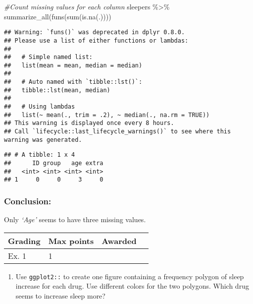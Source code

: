 \documentclass[
]{article}
\newenvironment{Shaded}{\begin{snugshade}}{\end{snugshade}}
\newcommand{\CommentTok}[1]{\textcolor[rgb]{0.56,0.35,0.01}{\textit{#1}}}
\newcommand{\FunctionTok}[1]{\textcolor[rgb]{0.00,0.00,0.00}{#1}}
\newcommand{\NormalTok}[1]{#1}
\newcommand{\SpecialCharTok}[1]{\textcolor[rgb]{0.00,0.00,0.00}{#1}}
\providecommand{\tightlist}{%
  \setlength{\itemsep}{0pt}\setlength{\parskip}{0pt}}
\begin{document}
\begin{Shaded}
\begin{Highlighting}[]
\CommentTok{\#Count missing values for each column}
\NormalTok{sleepers }\SpecialCharTok{\%\textgreater{}\%} 
  \FunctionTok{summarize\_all}\NormalTok{(}\FunctionTok{funs}\NormalTok{(}\FunctionTok{sum}\NormalTok{(}\FunctionTok{is.na}\NormalTok{(.))))}
\end{Highlighting}
\end{Shaded}

\begin{verbatim}
## Warning: `funs()` was deprecated in dplyr 0.8.0.
## Please use a list of either functions or lambdas: 
## 
##   # Simple named list: 
##   list(mean = mean, median = median)
## 
##   # Auto named with `tibble::lst()`: 
##   tibble::lst(mean, median)
## 
##   # Using lambdas
##   list(~ mean(., trim = .2), ~ median(., na.rm = TRUE))
## This warning is displayed once every 8 hours.
## Call `lifecycle::last_lifecycle_warnings()` to see where this warning was generated.
\end{verbatim}

\begin{verbatim}
## # A tibble: 1 x 4
##      ID group   age extra
##   <int> <int> <int> <int>
## 1     0     0     3     0
\end{verbatim}

\hypertarget{conclusion}{%
\subsubsection{Conclusion:}\label{conclusion}}

Only \emph{`Age'} seems to have three missing values.

\begin{longtable}[]{@{}llll@{}}
\toprule()
Grading & Max points & Awarded & \\
\midrule()
\endhead
Ex. 1 & 1 & & \\
\bottomrule()
\end{longtable}

\begin{enumerate}
\def\labelenumi{\arabic{enumi}.}
\setcounter{enumi}{1}
\tightlist
\item
  Use \texttt{ggplot2::} to create one figure containing a frequency
  polygon of sleep increase for each drug. Use different colors for the
  two polygons. Which drug seems to increase sleep more?
\end{enumerate}
\end{document}
